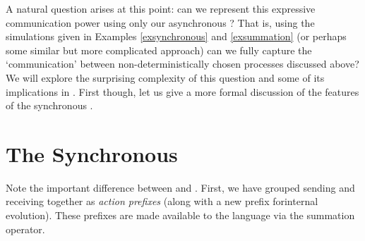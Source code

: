 A natural question arises at this point: can we represent this expressive communication power using only our asynchronous \picalc?  That is, using the simulations given in Examples \ref{exsynchronous} and \ref{exsummation} (or perhaps some similar but more complicated approach) can we fully capture the `communication' between non-deterministically chosen processes discussed above?  We will explore the surprising complexity of this question and some of its implications in .  
First though, let us give a more formal discussion of the features of the synchronous \picalc. 

\section{The Synchronous \Picalc}\label{Synchronous picalc}


Note the important difference between  and .  
First, we have grouped sending and receiving together as \emph{action prefixes} (along with a new prefix forinternal evolution). 
These prefixes are made available to the language via the summation operator. 

